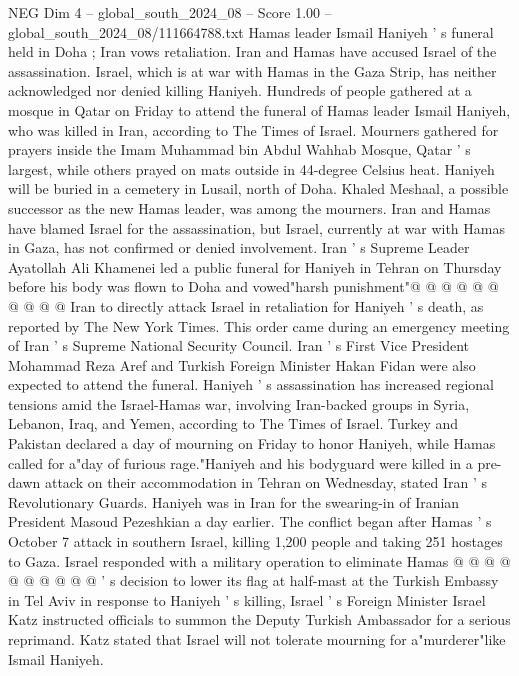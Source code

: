 \begin{textsample}{NEG Dim 4 – global\_south\_2024\_08 – Score 1.00 – global\_south\_2024\_08/111664788.txt}  \label{ex:f4_neg_332}
Hamas leader Ismail Haniyeh ' s funeral held in Doha ; Iran vows retaliation.
Iran and Hamas have accused Israel of the assassination.
Israel, which is at war with Hamas in the Gaza Strip, has neither acknowledged nor denied killing Haniyeh.
Hundreds of people gathered at a mosque in Qatar on Friday to attend the funeral of Hamas leader Ismail Haniyeh, who was killed in Iran, according to The Times of Israel.
Mourners gathered for prayers inside the Imam Muhammad bin Abdul Wahhab Mosque, Qatar ' s largest, while others prayed on mats outside in 44-degree Celsius heat.
Haniyeh will be buried in a cemetery in Lusail, north of Doha.
Khaled Meshaal, a possible successor as the new Hamas leader, was among the mourners.
Iran and Hamas have blamed Israel for the assassination, but Israel, currently at war with Hamas in Gaza, has not confirmed or denied involvement.
Iran ' s Supreme Leader Ayatollah Ali Khamenei led a public funeral for Haniyeh in Tehran on Thursday before his body was flown to Doha and vowed"harsh punishment"@ @ @ @ @ @ @ @ @ @ Iran to directly attack Israel in retaliation for Haniyeh ' s death, as reported by The New York Times.
This order came during an emergency meeting of Iran ' s Supreme National Security Council.
Iran ' s First Vice President Mohammad Reza Aref and Turkish Foreign Minister Hakan Fidan were also expected to attend the funeral.
Haniyeh ' s assassination has increased regional tensions amid the Israel-Hamas war, involving Iran-backed groups in Syria, Lebanon, Iraq, and Yemen, according to The Times of Israel.
Turkey and Pakistan declared a day of mourning on Friday to honor Haniyeh, while Hamas called for a"day of furious rage."Haniyeh and his bodyguard were killed in a pre-dawn attack on their accommodation in Tehran on Wednesday, stated Iran ' s Revolutionary Guards.
Haniyeh was in Iran for the swearing-in of Iranian President Masoud Pezeshkian a day earlier.
The conflict began after Hamas ' s October 7 attack in southern Israel, killing 1,200 people and taking 251 hostages to Gaza.
Israel responded with a military operation to eliminate Hamas @ @ @ @ @ @ @ @ @ @ ' s decision to lower its flag at half-mast at the Turkish Embassy in Tel Aviv in response to Haniyeh ' s killing, Israel ' s Foreign Minister Israel Katz instructed officials to summon the Deputy Turkish Ambassador for a serious reprimand.
Katz stated that Israel will not tolerate mourning for a"murderer"like Ismail Haniyeh.

\end{textsample}
